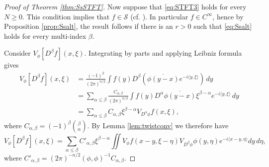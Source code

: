 \documentclass[11pt,a4paper,reqno]{amsart}
\numberwithin{equation}{section}
\theoremstyle{definition}
\theoremstyle{definition}
\begin{document}
\begin{proof}[Proof of Theorem \ref{thm:SsSTFT}]
Now suppose that \eqref{eq:STFT3} holds for every $N\geq 0$. This condition implies that $f\in \mathscr{S}$ (cf. \cite{grochenig}). In particular $f\in C^\infty$, hence by Proposition \ref{prop:Ssalt}, the result follows if there is an $r>0$ such that \eqref{eq:Ssalt} holds for every multi-index $\beta$.

Consider $V_\phi[D^\beta f](x,\xi)$. Integrating by parts and applying Leibniz formula gives
\begin{align*}
    V_\phi[D^\beta f](x,\xi) &= \frac{(-1)^\beta}{(2\pi)^{n/2}}\int f(y) D^\beta \left( \overline{\phi(y-x)} e^{-i\langle y,\xi \rangle} \right) \, d y \\
    &= \sum_{\alpha\leq\beta} \frac{C_{\alpha,\beta}}{(2\pi)^{n/2}} \int f(y) D^{\alpha}\overline{\phi(y-x)} \xi^{\beta-\alpha} e^{-i\langle y,\xi \rangle}\, d y \\
    &= \sum_{\alpha\leq\beta} C_{\alpha,\beta} \xi^{\beta-\alpha} V_{D^{\alpha}\phi} f(x,\xi),
\end{align*}
where $C_{\alpha,\beta} = (-1)^\beta \binom{\beta}{\alpha}$.
By Lemma \ref{lem:twistconv} we therefore have
\begin{equation}\label{eq:twist1}
    V_\phi[D^\beta f](x,\xi) =\sum_{\alpha\leq\beta} C'_{\alpha,\beta} \xi^{\beta-\alpha} \iint V_\phi f(x-y,\xi-\eta) V_{D^\beta\phi}\phi(y,\eta) e^{-i\langle x-y,\eta \rangle} d y \, d \eta,
\end{equation}
where $C'_{\alpha,\beta}=(2\pi)^{-n/2} (\phi,\phi)^{-1}C_{\alpha,\beta}$. 


\end{proof}
\end{document}
